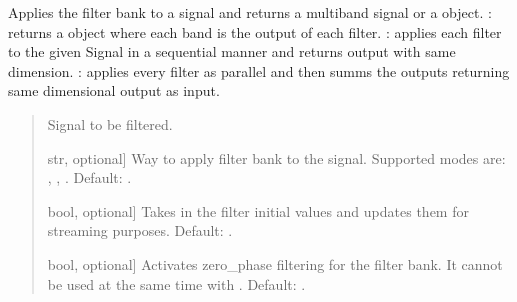 \documentclass[letterpaper,10pt,english]{sphinxmanual}
\begin{document}
\begin{fulllineitems}
\begin{fulllineitems}
\label{\detokenize{classes:dsptools.classes.filterbank.FilterBank.filter_signal}}
\pysigstartsignatures
{}
\pysigstopsignatures
\sphinxAtStartPar
Applies the filter bank to a signal and returns a multiband signal
or a  object.
: returns a  object where each band is
the output of each filter.
: applies each filter to the given Signal in a sequential
manner and returns output with same dimension.
: applies every filter as parallel and then summs the outputs
returning same dimensional output as input.
\begin{quote}\begin{description}
\begin{description}
\sphinxlineitem{\sphinxstylestrong{signal}}{[}\sphinxtitleref{Signal}{]}
\sphinxAtStartPar
Signal to be filtered.

\sphinxlineitem{\sphinxstylestrong{mode}}{[}str, optional{]}
\sphinxAtStartPar
Way to apply filter bank to the signal. Supported modes are:
, , . Default: .

\sphinxlineitem{\sphinxstylestrong{activate\_zi}}{[}bool, optional{]}
\sphinxAtStartPar
Takes in the filter initial values and updates them for
streaming purposes. Default: .

\sphinxlineitem{\sphinxstylestrong{zero\_phase}}{[}bool, optional{]}
\sphinxAtStartPar
Activates zero\_phase filtering for the filter bank. It cannot be
used at the same time with . Default: .


\end{description}
\end{description}
\end{quote}
\end{fulllineitems}
\end{fulllineitems}
\end{document}
